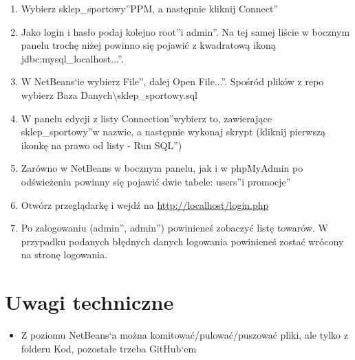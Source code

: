 \documentclass[a4paper, 11pt]{article}
\begin{document}
\begin{enumerate}
		\item Wybierz \quotedblbase sklep{\_}sportowy\textquotedblright PPM, a następnie kliknij \quotedblbase Connect\textquotedblright
		\item Jako login i hasło podaj kolejno \quotedblbase root\textquotedblright i \quotedblbase admin\textquotedblright. Na tej samej liście w bocznym panelu trochę niżej powinno się pojawić z kwadratową ikoną \quotedblbase jdbc:mysql{\_}localhost...\textquotedblright.
		\item W NetBeans`ie wybierz \quotedblbase File\textquotedblright, dalej \quotedblbase Open File...\textquotedblright. Spośród plików z repo wybierz Baza Danych\textbackslash sklep{\_}sportowy.sql
		\item W panelu edycji z listy \quotedblbase Connection\textquotedblright wybierz to, zawierające \quotedblbase sklep{\_}sportowy\textquotedblright w nazwie, a następnie wykonaj skrypt (kliknij pierwszą ikonkę na prawo od listy - \quotedblbase Run SQL\textquotedblright)
		\item Zarówno w NetBeans w bocznym panelu, jak i w phpMyAdmin po odświeżeniu powinny się pojawić dwie tabele: \quotedblbase users\textquotedblright i \quotedblbase promocje\textquotedblright
		\item Otwórz przeglądarkę i wejdź na \url{http://localhost/login.php}
		\item Po zalogowaniu (\quotedblbase admin\textquotedblright, \quotedblbase admin\textquotedblright) powinieneś zobaczyć listę towarów. W przypadku podanych błędnych danych logowania powinieneś zostać wrócony na stronę logowania.
	\end{enumerate}
	\section{Uwagi techniczne}
	\begin{itemize}
		\item Z poziomu NetBeans`a można komitować/pulować/puszować pliki, ale tylko z folderu Kod, pozostałe trzeba GitHub`em
	\end{itemize}
\end{document}
